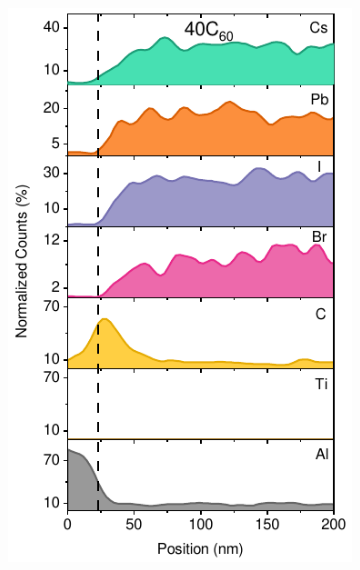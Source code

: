 \begin{figure}[htbp]
    \centering
    \begin{subfigure}{0.32\textwidth}
        \centering
        \includegraphics[width=\textwidth]{chapters/transport_layers/images/TEM_40C60.pdf}
        \caption{}
        \label{}
    \end{subfigure}
    \hfill
    \begin{subfigure}{0.32\textwidth}
        \centering

\end{subfigure}
\end{figure}
